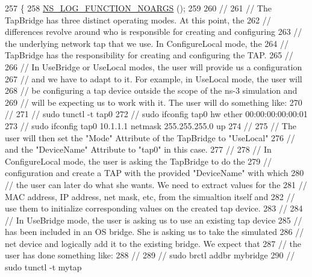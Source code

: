 \begin{DoxyCode}
257 \{
258   \hyperlink{log-macros-disabled_8h_a8f7e4afc291c9d29a65c18ac1f79197b}{NS\_LOG\_FUNCTION\_NOARGS} ();
259 
260   \textcolor{comment}{// }
261   \textcolor{comment}{// The TapBridge has three distinct operating modes.  At this point, the}
262   \textcolor{comment}{// differences revolve around who is responsible for creating and configuring}
263   \textcolor{comment}{// the underlying network tap that we use.  In ConfigureLocal mode, the }
264   \textcolor{comment}{// TapBridge has the responsibility for creating and configuring the TAP.}
265   \textcolor{comment}{//}
266   \textcolor{comment}{// In UseBridge or UseLocal modes, the user will provide us a configuration}
267   \textcolor{comment}{// and we have to adapt to it.  For example, in UseLocal mode, the user will}
268   \textcolor{comment}{// be configuring a tap device outside the scope of the ns-3 simulation and}
269   \textcolor{comment}{// will be expecting us to work with it.  The user will do something like:}
270   \textcolor{comment}{//}
271   \textcolor{comment}{//   sudo tunctl -t tap0}
272   \textcolor{comment}{//   sudo ifconfig tap0 hw ether 00:00:00:00:00:01}
273   \textcolor{comment}{//   sudo ifconfig tap0 10.1.1.1 netmask 255.255.255.0 up}
274   \textcolor{comment}{//}
275   \textcolor{comment}{// The user will then set the "Mode" Attribute of the TapBridge to "UseLocal"}
276   \textcolor{comment}{// and the "DeviceName" Attribute to "tap0" in this case.}
277   \textcolor{comment}{//}
278   \textcolor{comment}{// In ConfigureLocal mode, the user is asking the TapBridge to do the }
279   \textcolor{comment}{// configuration and create a TAP with the provided "DeviceName" with which }
280   \textcolor{comment}{// the user can later do what she wants.  We need to extract values for the}
281   \textcolor{comment}{// MAC address, IP address, net mask, etc, from the simualtion itself and }
282   \textcolor{comment}{// use them to initialize corresponding values on the created tap device.}
283   \textcolor{comment}{//}
284   \textcolor{comment}{// In UseBridge mode, the user is asking us to use an existing tap device}
285   \textcolor{comment}{// has been included in an OS bridge.  She is asking us to take the simulated}
286   \textcolor{comment}{// net device and logically add it to the existing bridge.  We expect that}
287   \textcolor{comment}{// the user has done something like:}
288   \textcolor{comment}{//}
289   \textcolor{comment}{//   sudo brctl addbr mybridge}
290   \textcolor{comment}{//   sudo tunctl -t mytap}

\end{DoxyCode}
